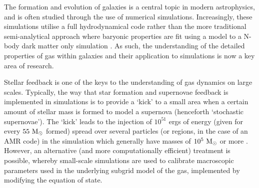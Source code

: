 The formation and evolution of galaxies is a central topic in modern astrophysics, and is often studied through the use of numerical simulations.
Increasingly, these simulations utilise a full hydrodynamical code \citep{vogelsberger_introducing_2014,schaye_eagle_2015} rather than the more traditional semi-analytical approach where baryonic properties are fit using a model to a N-body dark matter only simulation \citep{baugh_primer_2006, bower_breaking_2006}.
As such, the understanding of the detailed properties of gas within galaxies and their application to simulations is now a key area of research.

Stellar feedback is one of the keys to the understanding of gas dynamics on large scales.
Typically, the way that star formation and supernovae feedback is implemented in simulations is to provide a `kick' to a small area when a certain amount of stellar mass is formed to model a supernova (henceforth `stochastic supernovae').
The `kick' leads to the injection of $10^{51}$ ergs of energy (given for every $55 ~\mathrm{M}_{\odot}$ formed) spread over several particles (or regions, in the case of an AMR code) in the simulation which generally have masses of $10^5 ~\mathrm{M}_{\odot}$ or more \citep{tasker_simulating_2006, joung_dependence_2009, hummels_adaptive_2012, hopkins_meaning_2013, becerra_interstellar_2014}.
However, an alternative (and more computationally efficient) treatment is possible, whereby small-scale simulations are used to calibrate macroscopic parameters used in the underlying subgrid model of the gas, implemented by modifying the equation of state.
